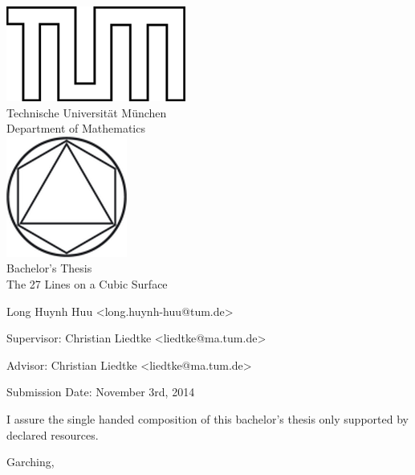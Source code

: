 \begin{titlepage}
\begin{center}
\includegraphics{TUMlschwarz.png}\\[3mm]
\sf
{\Large
  Technische Universit\"at M\"unchen\\[5mm]
  Department of Mathematics\\[8mm]
}
\normalsize
\includegraphics{TUMlMschwarz.png}\\[15mm]

Bachelor's Thesis\\[15mm]

{\Huge
  The 27 Lines on a Cubic Surface
}
\bigskip

\normalsize

Long Huynh Huu <long.huynh-huu@tum.de>
\end{center}
\vspace*{75mm}

Supervisor: Christian Liedtke <liedtke@ma.tum.de>
\medskip

Advisor: Christian Liedtke <liedtke@ma.tum.de>
\medskip

Submission Date: November 3rd, 2014

\end{titlepage}


\vspace*{150mm}

I assure the single handed composition of this bachelor's thesis only supported by declared resources.
\bigskip

Garching, 
\newpage
